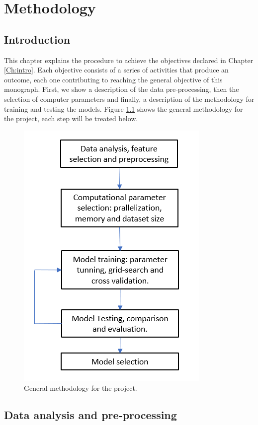\chapter{Methodology}
\section{Introduction}
This chapter explains the procedure to achieve the objectives declared in Chapter \ref{Ch:intro}. Each objective consists of a series of activities that produce an outcome, each one contributing to reaching the general objective of this monograph. First, we show a description of the data pre-processing, then the selection of computer parameters and finally, a description of the methodology for training and testing the models. Figure \ref{fig:generalmet} shows the general methodology for the project, each step will be treated below.  

\begin{figure}[h!]
	\centering
	\includegraphics[width=0.5\linewidth]{TeX_files/Imagenes/general_met}
	\caption{General methodology for the project.}
	\label{fig:generalmet}
\end{figure}

\section{Data analysis and pre-processing}

